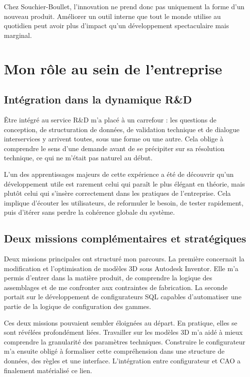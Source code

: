 Chez Souchier-Boullet, l'innovation ne prend donc pas uniquement la forme d'un nouveau produit. Améliorer un outil interne que tout le monde utilise au quotidien peut avoir plus d'impact qu'un développement spectaculaire mais marginal.

\section{Mon rôle au sein de l'entreprise}

\subsection{Intégration dans la dynamique R\&D}

Être intégré au service R\&D m'a placé à un carrefour : les questions de conception, de structuration de données, de validation technique et de dialogue interservices y arrivent toutes, sous une forme ou une autre. Cela oblige à comprendre le sens d'une demande avant de se précipiter sur sa résolution technique, ce qui ne m'était pas naturel au début.

L'un des apprentissages majeurs de cette expérience a été de découvrir qu'un développement utile est rarement celui qui paraît le plus élégant en théorie, mais plutôt celui qui s'insère correctement dans les pratiques de l'entreprise. Cela implique d'écouter les utilisateurs, de reformuler le besoin, de tester rapidement, puis d'itérer sans perdre la cohérence globale du système.

\subsection{Deux missions complémentaires et stratégiques}

Deux missions principales ont structuré mon parcours. La première concernait la modification et l'optimisation de modèles 3D sous Autodesk Inventor. Elle m'a permis d'entrer dans la matière produit, de comprendre la logique des assemblages et de me confronter aux contraintes de fabrication. La seconde portait sur le développement de configurateurs SQL capables d'automatiser une partie de la logique de configuration des gammes.

Ces deux missions pouvaient sembler éloignées au départ. En pratique, elles se sont révélées profondément liées. Travailler sur les modèles 3D m'a aidé à mieux comprendre la granularité des paramètres techniques. Construire le configurateur m'a ensuite obligé à formaliser cette compréhension dans une structure de données, des règles et une interface. L'intégration entre configurateur et CAO a finalement matérialisé ce lien.

